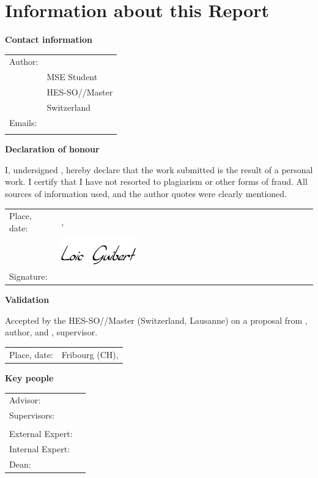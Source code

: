 \chapter*{Information about this Report}

\vspace{\fill}

\textbf{Contact information}

\begin{tabularx}{\textwidth}{N{2.6cm}p{6.1cm}}
	Author:	 & \Author \\
	& MSE Student \\
	& HES-SO//Master \\
	& Switzerland \\
	Emails: & \email{\AuthorEmail} \\
	& \email{\AuthorEmailBackup}
\end{tabularx}

\vspace{\fill}

\textbf{Declaration of honour}

I, undersigned \Author, hereby declare that the work submitted is 
the result of a personal work. I certify that I have not resorted to 
plagiarism or other forms of fraud. All sources of information used, and the 
author quotes were clearly mentioned.

{\renewcommand{\arraystretch}{0}
\begin{tabularx}{\textwidth}{N{2.6cm}X}
	Place, date:	& \Place, \Date \\ 
					& \includegraphics[width=0.3\textwidth]{img/signature.png} \\
	Signature:		& \underline{\hspace{6.1cm}}
\end{tabularx}
}

\vspace{\fill}

\textbf{Validation}

Accepted by the HES-SO//Master (Switzerland, Lausanne) on a proposal from \Author, author, and \SupervisorOne, supervisor.

\begin{tabularx}{\textwidth}{N{2.6cm}p{6.1cm}}
	Place, date: & Fribourg (CH),  \\
\end{tabularx}


\vspace{\fill}

\textbf{Key people}

\begin{tabularx}{\textwidth}{N{2.6cm}p{6.1cm}}

	Advisor:	&		\Advisor \\
	Supervisors: &		\SupervisorOne \\
	&					\SupervisorTwo \\
	External Expert: &	\Expert \\
	Internal Expert: &	\ExpertInternal \: &				\Dean \\
\end{tabularx}


